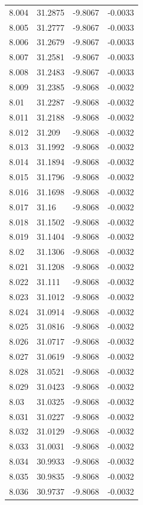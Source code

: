 \begin{tabular}{llll}
8.004 & 31.2875 & -9.8067 & -0.0033 \\
8.005 & 31.2777 & -9.8067 & -0.0033 \\
8.006 & 31.2679 & -9.8067 & -0.0033 \\
8.007 & 31.2581 & -9.8067 & -0.0033 \\
8.008 & 31.2483 & -9.8067 & -0.0033 \\
8.009 & 31.2385 & -9.8068 & -0.0032 \\
8.01 & 31.2287 & -9.8068 & -0.0032 \\
8.011 & 31.2188 & -9.8068 & -0.0032 \\
8.012 & 31.209 & -9.8068 & -0.0032 \\
8.013 & 31.1992 & -9.8068 & -0.0032 \\
8.014 & 31.1894 & -9.8068 & -0.0032 \\
8.015 & 31.1796 & -9.8068 & -0.0032 \\
8.016 & 31.1698 & -9.8068 & -0.0032 \\
8.017 & 31.16 & -9.8068 & -0.0032 \\
8.018 & 31.1502 & -9.8068 & -0.0032 \\
8.019 & 31.1404 & -9.8068 & -0.0032 \\
8.02 & 31.1306 & -9.8068 & -0.0032 \\
8.021 & 31.1208 & -9.8068 & -0.0032 \\
8.022 & 31.111 & -9.8068 & -0.0032 \\
8.023 & 31.1012 & -9.8068 & -0.0032 \\
8.024 & 31.0914 & -9.8068 & -0.0032 \\
8.025 & 31.0816 & -9.8068 & -0.0032 \\
8.026 & 31.0717 & -9.8068 & -0.0032 \\
8.027 & 31.0619 & -9.8068 & -0.0032 \\
8.028 & 31.0521 & -9.8068 & -0.0032 \\
8.029 & 31.0423 & -9.8068 & -0.0032 \\
8.03 & 31.0325 & -9.8068 & -0.0032 \\
8.031 & 31.0227 & -9.8068 & -0.0032 \\
8.032 & 31.0129 & -9.8068 & -0.0032 \\
8.033 & 31.0031 & -9.8068 & -0.0032 \\
8.034 & 30.9933 & -9.8068 & -0.0032 \\
8.035 & 30.9835 & -9.8068 & -0.0032 \\
8.036 & 30.9737 & -9.8068 & -0.0032 \\

\end{tabular}
